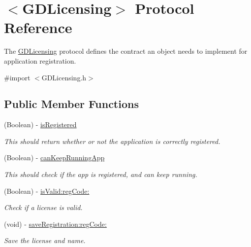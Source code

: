 \hypertarget{protocol_g_d_licensing-p}{
\section{$<$GDLicensing$>$ Protocol Reference}
\label{protocol_g_d_licensing-p}
}


The \hyperlink{protocol_g_d_licensing-p}{GDLicensing} protocol defines the contract an object needs to implement for application registration.  


{\ttfamily \#import $<$GDLicensing.h$>$}\subsection*{Public Member Functions}
\begin{DoxyCompactItemize}
\item 
\hypertarget{protocol_g_d_licensing-p_aa39356d320e6af1091d04ffc0f1077d5}{
(Boolean) -\/ \hyperlink{protocol_g_d_licensing-p_aa39356d320e6af1091d04ffc0f1077d5}{isRegistered}}
\label{protocol_g_d_licensing-p_aa39356d320e6af1091d04ffc0f1077d5}

\begin{DoxyCompactList}\small\item\em This should return whether or not the application is correctly registered. \item\end{DoxyCompactList}\item 
\hypertarget{protocol_g_d_licensing-p_a9721e08d9f727758553ece0514cd29c4}{
(Boolean) -\/ \hyperlink{protocol_g_d_licensing-p_a9721e08d9f727758553ece0514cd29c4}{canKeepRunningApp}}
\label{protocol_g_d_licensing-p_a9721e08d9f727758553ece0514cd29c4}

\begin{DoxyCompactList}\small\item\em This should check if the app is registered, and can keep running. \item\end{DoxyCompactList}\item 
\hypertarget{protocol_g_d_licensing-p_a5356b4992f98aef8a0f4b01c37253478}{
(Boolean) -\/ \hyperlink{protocol_g_d_licensing-p_a5356b4992f98aef8a0f4b01c37253478}{isValid:regCode:}}
\label{protocol_g_d_licensing-p_a5356b4992f98aef8a0f4b01c37253478}

\begin{DoxyCompactList}\small\item\em Check if a license is valid. \item\end{DoxyCompactList}\item 
\hypertarget{protocol_g_d_licensing-p_a0486c9c1bdfc05f517764e8f97b78048}{
(void) -\/ \hyperlink{protocol_g_d_licensing-p_a0486c9c1bdfc05f517764e8f97b78048}{saveRegistration:regCode:}}
\label{protocol_g_d_licensing-p_a0486c9c1bdfc05f517764e8f97b78048}

\begin{DoxyCompactList}\small\item\em Save the license and name. \item\end{DoxyCompactList}\end{DoxyCompactItemize}


